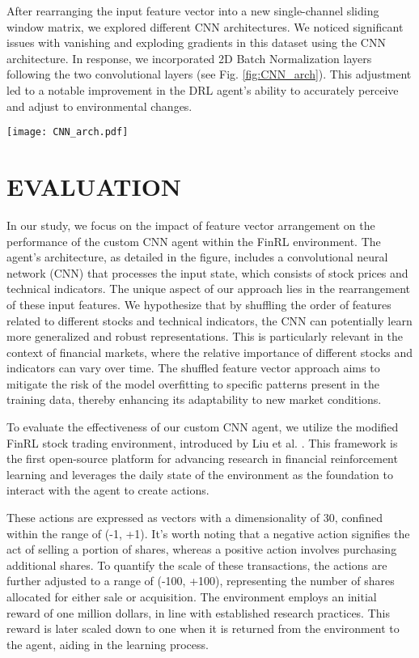 {After rearranging the input feature vector into a new single-channel sliding window matrix, we explored different CNN architectures. We noticed significant issues with vanishing and exploding gradients in this dataset using the CNN architecture. In response, we incorporated 2D Batch Normalization layers following the two convolutional layers (see Fig. \ref{fig:CNN_arch}). This adjustment led to a notable improvement in the DRL agent's ability to accurately perceive and adjust to environmental changes.

\begin{figure*}[htbp]
\centerline
{\texttt{[image: CNN\_arch.pdf]}}
\caption{Our CNN architecture.}
\label{fig:CNN_arch}
\end{figure*}


\section{EVALUATION}
In our study, we focus on the impact of feature vector arrangement on the performance of the custom CNN agent within the FinRL environment. The agent's architecture, as detailed in the figure, includes a convolutional neural network (CNN) that processes the input state, which consists of stock prices and technical indicators. The unique aspect of our approach lies in the rearrangement of these input features. We hypothesize that by shuffling the order of features related to different stocks and technical indicators, the CNN can potentially learn more generalized and robust representations. This is particularly relevant in the context of financial markets, where the relative importance of different stocks and indicators can vary over time. The shuffled feature vector approach aims to mitigate the risk of the model overfitting to specific patterns present in the training data, thereby enhancing its adaptability to new market conditions.

To evaluate the effectiveness of our custom CNN agent, we utilize the modified FinRL stock trading environment, introduced by Liu et al. \cite{liu2022finrl}. This framework is the first open-source platform for advancing research in financial reinforcement learning and leverages the daily state of the environment as the foundation to interact with the agent to create actions. 

These actions are expressed as vectors with a dimensionality of 30, confined within the range of (-1, +1). It's worth noting that a negative action signifies the act of selling a portion of shares, whereas a positive action involves purchasing additional shares. To quantify the scale of these transactions, the actions are further adjusted to a range of (-100, +100), representing the number of shares allocated for either sale or acquisition. The environment employs an initial reward of one million dollars, in line with established research practices. This reward is later scaled down to one when it is returned from the environment to the agent, aiding in the learning process.

}
